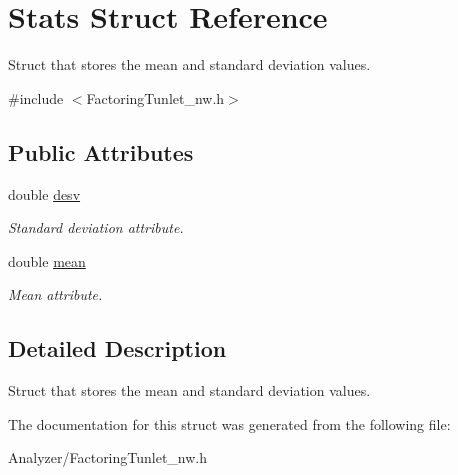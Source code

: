 \hypertarget{struct_stats}{\section{Stats Struct Reference}
\label{struct_stats}
}


Struct that stores the mean and standard deviation values.  




{\ttfamily \#include $<$Factoring\-Tunlet\-\_\-nw.\-h$>$}

\subsection*{Public Attributes}
\begin{DoxyCompactItemize}
\item 
\hypertarget{struct_stats_aff9e248a30300f9ee75b769711710e11}{double \hyperlink{struct_stats_aff9e248a30300f9ee75b769711710e11}{desv}}\label{struct_stats_aff9e248a30300f9ee75b769711710e11}

\begin{DoxyCompactList}\small\item\em Standard deviation attribute. \end{DoxyCompactList}\item 
\hypertarget{struct_stats_a86955b8af9ad896d030e05db42b97065}{double \hyperlink{struct_stats_a86955b8af9ad896d030e05db42b97065}{mean}}\label{struct_stats_a86955b8af9ad896d030e05db42b97065}

\begin{DoxyCompactList}\small\item\em Mean attribute. \end{DoxyCompactList}\end{DoxyCompactItemize}


\subsection{Detailed Description}
Struct that stores the mean and standard deviation values. 

The documentation for this struct was generated from the following file\-:\begin{DoxyCompactItemize}
\item 
Analyzer/Factoring\-Tunlet\-\_\-nw.\-h\end{DoxyCompactItemize}
